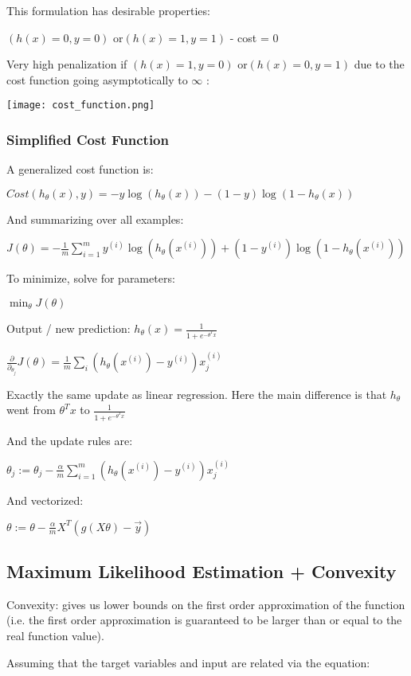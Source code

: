 This formulation has desirable properties: 

$(h(x)=0, y = 0)$ or$(h(x) = 1, y = 1)$  - cost = 0

Very high penalization if $(h(x)=1, y = 0)$ or$(h(x) = 0, y = 1)$ due to the cost function going asymptotically to $\infty$ :

\texttt{[image: cost\_function.png]}

\subsubsection{Simplified Cost Function}

A generalized cost function is: 

$Cost(h_\theta (x), y) =-y\log(h_\theta(x))-(1-y)\log(1-h_\theta(x))  $

And summarizing over all examples:

$J(\theta)= -\frac{1}{m} \sum_{i=1}^{m} y^{(i)}\log(h_\theta(x^{(i)}))+(1-y^{(i)})\log(1-h_\theta(x^{(i)}))$

To minimize, solve for parameters:

$\min_{\theta} J(\theta) $ 

Output / new prediction: $h_\theta(x) = \frac{1}{1+e^{-\theta^T x}}$

$\frac{\partial}{\partial_{\theta_j}} J(\theta) = \frac 1 m \sum_i (h_\theta(x^{(i)})-y^{(i)})x_j^{(i)}$

Exactly the same update as linear regression. Here the main difference is that $h_\theta$  went from $\theta^T x $ to $\frac{1}{1+e^{-\theta^Tx}}$

And the update rules are:

$\theta_j := \theta_j - \frac{\alpha}{m} \sum_{i=1}^m (h_\theta(x^{(i)}) - y^{(i)}) x_j^{(i)}$

And vectorized:

$\theta:=\theta - \frac{\alpha}{m}X^T(g(X\theta)-\vec{y})$

\subsection{ Maximum Likelihood Estimation + Convexity}

Convexity: gives us lower bounds on the first order approximation of the function (i.e. the first order approximation is guaranteed to be larger than or equal to the real function value).

Assuming that the target variables and input are related via the equation: 

